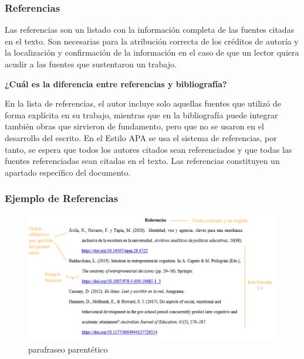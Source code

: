 \documentclass[
11pt, %
]{beamer}
\begin{document}
\begin{frame}
	\frametitle{Referencias}

Las referencias son un listado con la información completa de las fuentes citadas en
el texto. Son necesarias para la atribución correcta de los créditos de autoría y la
localización y confirmación de la información en el caso de que un lector quiera acudir a
las fuentes que sustentaron un trabajo.

\textbf{¿Cuál es la diferencia entre referencias y bibliografía?}

En la lista de referencias, el autor incluye solo aquellas fuentes que utilizó de
forma explícita en su trabajo, mientras que en la bibliografía puede integrar también obras
que sirvieron de fundamento, pero que no se usaron en el desarrollo del escrito. En el Estilo
APA se usa el sistema de referencias, por tanto, se espera que todos los autores citados sean
referenciados y que todas las fuentes referenciadas sean citadas en el texto.
Las referencias constituyen un apartado específico del documento.

\end{frame}

\begin{frame}
	\frametitle{Ejemplo de Referencias}

		\begin{exampleblock}{}
		\begin{figure}
			\centering
			\includegraphics[width=1\linewidth]{images/screenshot007}
			\caption{parafraseo parentético}
			\label{fig:screenshot007}
		\end{figure}
	\end{exampleblock}

\end{frame}
\end{document}
